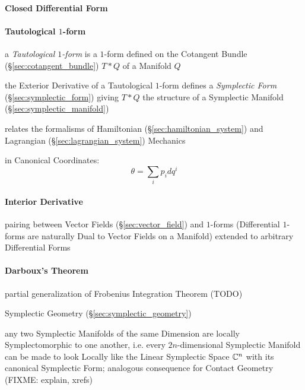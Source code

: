 \paragraph{Closed Differential Form}\label{sec:closed_differential_form}\hfill

\paragraph{Tautological $1$-form}\label{sec:tautological_1form}\hfill

a \emph{Tautological $1$-form} is a $1$-form defined on the Cotangent Bundle
(\S\ref{sec:cotangent_bundle}) $T * Q$ of a Manifold $Q$

the Exterior Derivative of a Tautological $1$-form defines a \emph{Symplectic
  Form} (\S\ref{sec:symplectic_form}) giving $T * Q$ the structure of a
Symplectic Manifold (\S\ref{sec:symplectic_manifold})

relates the formalisms of Hamiltonian (\S\ref{sec:hamiltonian_system}) and
Lagrangian (\S\ref{sec:lagrangian_system}) Mechanics

in Canonical Coordinates:
\[
  \theta = \sum_i p_i dq^i
\]



\paragraph{Interior Derivative}\label{sec:interior_derivative}\hfill

pairing between Vector Fields (\S\ref{sec:vector_field}) and $1$-forms
(Differential $1$-forms are naturally Dual to Vector Fields on a Manifold)
extended to arbitrary Differential Forms



\paragraph{Darboux's Theorem}\label{sec:darbouxs_theorem}\hfill

partial generalization of Frobenius Integration Theorem (TODO)

Symplectic Geometry (\S\ref{sec:symplectic_geometry})

any two Symplectic Manifolds of the same Dimension are locally Symplectomorphic
to one another, i.e. every $2n$-dimensional Symplectic Manifold can be made to
look Locally like the Linear Symplectic Space $\mathbb{C}^n$ with its canonical
Symplectic Form; analogous consequence for Contact Geometry (FIXME: explain,
xrefs)



